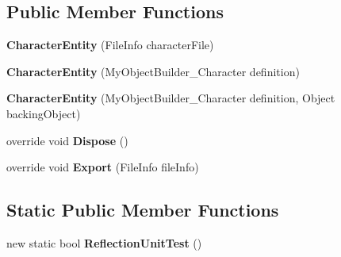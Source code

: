 \subsection*{Public Member Functions}
\begin{DoxyCompactItemize}
\item 
\hypertarget{class_s_e_mod_a_p_i_internal_1_1_a_p_i_1_1_entity_1_1_sector_1_1_sector_object_1_1_character_entity_a5496ba3663a3e21e6abc03c73d9a099d}{}{\bfseries Character\+Entity} (File\+Info character\+File)\label{class_s_e_mod_a_p_i_internal_1_1_a_p_i_1_1_entity_1_1_sector_1_1_sector_object_1_1_character_entity_a5496ba3663a3e21e6abc03c73d9a099d}

\item 
\hypertarget{class_s_e_mod_a_p_i_internal_1_1_a_p_i_1_1_entity_1_1_sector_1_1_sector_object_1_1_character_entity_a811e49069d7940d48b90e54613b1a173}{}{\bfseries Character\+Entity} (My\+Object\+Builder\+\_\+\+Character definition)\label{class_s_e_mod_a_p_i_internal_1_1_a_p_i_1_1_entity_1_1_sector_1_1_sector_object_1_1_character_entity_a811e49069d7940d48b90e54613b1a173}

\item 
\hypertarget{class_s_e_mod_a_p_i_internal_1_1_a_p_i_1_1_entity_1_1_sector_1_1_sector_object_1_1_character_entity_a0679ee0aa75150237a37c8f2768133ae}{}{\bfseries Character\+Entity} (My\+Object\+Builder\+\_\+\+Character definition, Object backing\+Object)\label{class_s_e_mod_a_p_i_internal_1_1_a_p_i_1_1_entity_1_1_sector_1_1_sector_object_1_1_character_entity_a0679ee0aa75150237a37c8f2768133ae}

\item 
\hypertarget{class_s_e_mod_a_p_i_internal_1_1_a_p_i_1_1_entity_1_1_sector_1_1_sector_object_1_1_character_entity_a31a4f26d194cff007b9477e3b7493590}{}override void {\bfseries Dispose} ()\label{class_s_e_mod_a_p_i_internal_1_1_a_p_i_1_1_entity_1_1_sector_1_1_sector_object_1_1_character_entity_a31a4f26d194cff007b9477e3b7493590}

\item 
\hypertarget{class_s_e_mod_a_p_i_internal_1_1_a_p_i_1_1_entity_1_1_sector_1_1_sector_object_1_1_character_entity_a742f5f4a6d54b558e2c08af69731fa1b}{}override void {\bfseries Export} (File\+Info file\+Info)\label{class_s_e_mod_a_p_i_internal_1_1_a_p_i_1_1_entity_1_1_sector_1_1_sector_object_1_1_character_entity_a742f5f4a6d54b558e2c08af69731fa1b}

\end{DoxyCompactItemize}
\subsection*{Static Public Member Functions}
\begin{DoxyCompactItemize}
\item 
\hypertarget{class_s_e_mod_a_p_i_internal_1_1_a_p_i_1_1_entity_1_1_sector_1_1_sector_object_1_1_character_entity_a32dbc6c37ec262cdbe6ed1e23af0b2e4}{}new static bool {\bfseries Reflection\+Unit\+Test} ()\label{class_s_e_mod_a_p_i_internal_1_1_a_p_i_1_1_entity_1_1_sector_1_1_sector_object_1_1_character_entity_a32dbc6c37ec262cdbe6ed1e23af0b2e4}

\end{DoxyCompactItemize}
